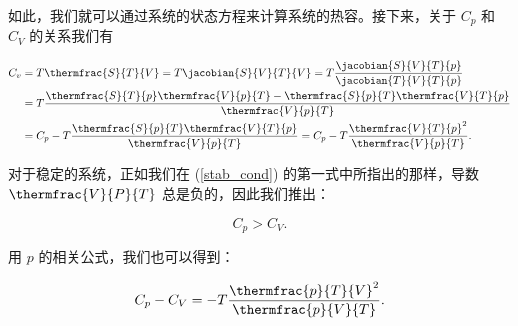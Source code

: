 如此，我们就可以通过系统的状态方程来计算系统的热容。接下来，关于 $C_p$ 和 $C_V$ 的关系我们有
\begin{linenomath}\begin{equation}
\begin{aligned}
    C_v &= T\thermfrac{S}{T}{V} = T \jacobian{S}{V}{T}{V} = T\frac{\jacobian{S}{V}{T}{p}}{\jacobian{T}{V}{T}{p}}\\
    &= T\frac{\thermfrac{S}{T}{p}\thermfrac{V}{p}{T} - \thermfrac{S}{p}{T}\thermfrac{V}{T}{p}}{\thermfrac{V}{p}{T}} \\
    &= C_p-T\frac{\thermfrac{S}{p}{T}\thermfrac{V}{T}{p}}{\thermfrac{V}{p}{T}} = C_p-T\frac{\thermfrac{V}{T}{p}^2}{\thermfrac{V}{p}{T}}.
\end{aligned}
\end{equation}\end{linenomath}
对于稳定的系统，正如我们在 (\ref{stab_cond}) 的第一式中所指出的那样，导数 $\thermfrac{V}{P}{T}$ 总是负的，因此我们推出：
\begin{linenomath}\begin{equation}
C_p>C_V.
\end{equation}\end{linenomath}
用 $p$ 的相关公式，我们也可以得到：
\begin{linenomath}\begin{equation}
C_p - C_V = -T\frac{\thermfrac{p}{T}{V}^2}{\thermfrac{p}{V}{T}}.
\end{equation}\end{linenomath}


